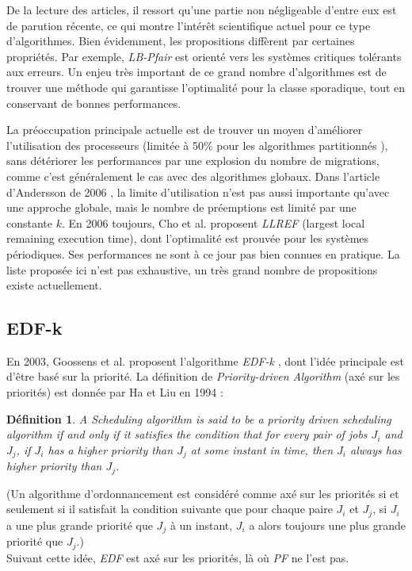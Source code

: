 \documentclass[11pt,a4paper,oneside]{report}
\newtheorem{mydef}{Définition}
\begin{document}
De la lecture des articles, il ressort qu'une partie non négligeable d'entre eux 
est de parution récente, ce qui montre l'intérêt scientifique actuel pour ce type d'algorithmes. 
Bien évidemment, les propositions diffèrent par certaines propriétés. Par exemple, 
\textit{LB-Pfair} est orienté vers les systèmes critiques tolérants aux erreurs. 
Un enjeu très important de ce grand nombre d'algorithmes est de trouver une méthode qui 
garantisse l'optimalité pour la classe sporadique, tout en conservant de bonnes performances. 

La préoccupation principale actuelle est de trouver un moyen d'améliorer l'utilisation des processeurs (limitée à 
50\% pour les algorithmes partitionnés \cite{oh_utilization_1998}), sans détériorer les performances par 
une explosion du nombre de migrations, comme c'est généralement le cas avec des algorithmes globaux. 
Dans l'article d'Andersson de 2006 \cite{andersson_multiprocessor_2006}, la limite d'utilisation 
n'est pas aussi importante qu'avec une approche globale, mais le nombre de préemptions est limité par 
une constante $k$. En 2006 toujours, Cho et al. \cite{cho_optimal_2006} proposent \textit{LLREF} 
(largest local remaining execution time), dont l'optimalité est prouvée pour les 
systèmes périodiques. Ses performances ne sont à ce jour pas bien connues en pratique. %
La liste proposée ici n'est pas exhaustive, un très grand nombre de propositions existe actuellement. 

\subsection{EDF-k}
En 2003, Goossens et al. proposent l'algorithme \textit{EDF-k} \cite{goossens_priority-driven_2003}, 
dont l'idée principale est d'être basé sur la priorité. 
La définition de \textit{Priority-driven Algorithm} (axé sur les priorités) 
est donnée par Ha et Liu en 1994 :
\begin{mydef}
	A Scheduling algorithm is said to be a priority driven scheduling algorithm if and 
	only if it satisfies the condition 
	that for every pair of jobs $J_i$ and $J_j$, if $J_i$ has a higher priority than $J_j$ at 
	some instant in time, then $J_i$ always has higher priority than $J_j$.
\end{mydef}
(Un algorithme d'ordonnancement est considéré comme axé sur les priorités si et seulement si il 
satisfait la condition suivante que pour chaque paire $J_i$ et $J_j$, si $J_i$ a une plus 
grande priorité que $J_j$ à un instant, $J_i$ a alors toujours une plus grande priorité 
que $J_j$.)\\
Suivant cette idée, \textit{EDF} est axé sur les priorités, là où \textit{PF} ne l'est pas.\\
\end{document}
